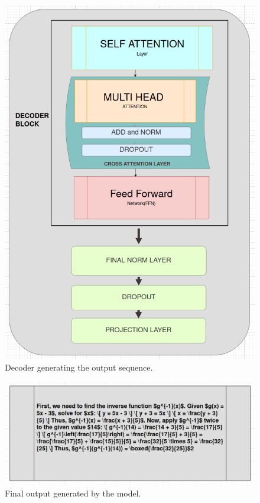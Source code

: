 \documentclass{article}
\begin{document}
\begin{figure}[H]
  \centering
  \includegraphics[width=\textwidth]{./figures/decoder.png}
  \caption{Decoder generating the output sequence.}
  \label{fig:decoder}
\end{figure}

\begin{figure}[H]
  \centering
  \includegraphics[width=\textwidth]{./figures/output.png}
  \caption{Final output generated by the model.}
  \label{fig:output}
\end{figure}
\end{document}
